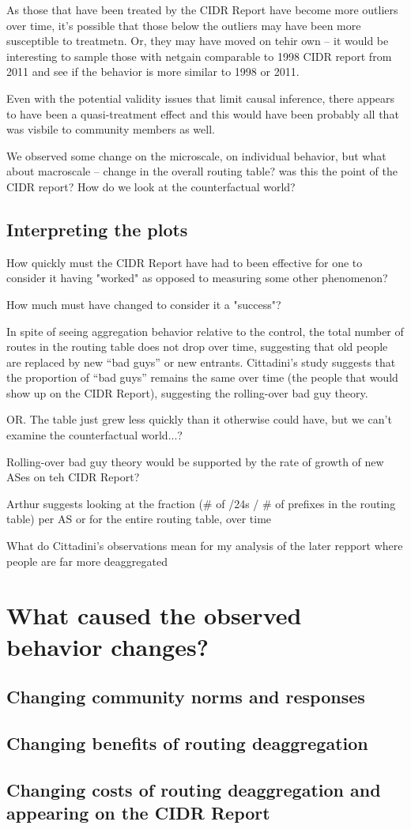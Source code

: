 As those that have been treated by the CIDR Report have become more outliers
over time, it's possible that those below the outliers may have been more
susceptible to treatmetn. Or, they may have moved on tehir own -- it would be
interesting to sample those with netgain comparable to 1998 CIDR report from
2011 and see if the behavior is more similar to 1998 or 2011.

Even with the potential validity issues that limit causal inference, there
appears to have been a quasi-treatment effect and this would have been probably
all that was visbile to community members as well.

We observed some change on the microscale, on individual behavior, but what
about macroscale -- change in the overall routing table? was this the point of
the CIDR report? How do we look at the counterfactual world?

\subsection{Interpreting the plots}

How quickly must the CIDR Report have had to been effective for one to consider
it having "worked" as opposed to measuring some other phenomenon?

How much must have changed to consider it a "success"?

In spite of seeing aggregation behavior relative to the control, the total
number of routes in the routing table does not drop over time, suggesting that
old people are replaced by new ``bad guys'' or new entrants. Cittadini's study
suggests that the proportion of ``bad guys'' remains the same over time (the
people that would show up on the CIDR Report), suggesting the rolling-over bad
guy theory.

OR. The table just grew less quickly than it otherwise could have, but we can't
examine the counterfactual world...?

Rolling-over bad guy theory would be supported by the rate of growth of new
ASes on teh CIDR Report?

Arthur suggests looking at the fraction (\# of /24s / \# of prefixes in the
routing table) per AS or for the entire routing table, over time

What do Cittadini's observations mean for my analysis of the later repport
where people are far more deaggregated

\section{What caused the observed behavior changes?}
\subsection{Changing community norms and responses}
\subsection{Changing benefits of routing deaggregation}
\subsection{Changing costs of routing deaggregation and
appearing on the CIDR Report}


